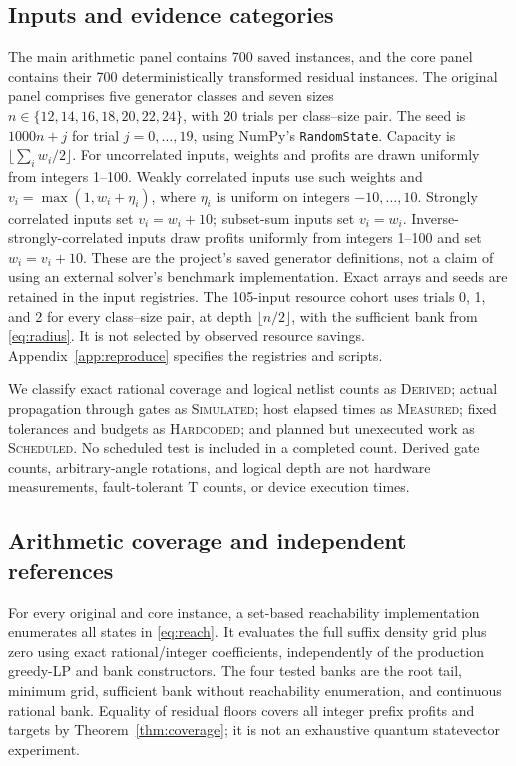 \documentclass[referee,pdflatex,sn-mathphys-num]{sn-jnl}
\theoremstyle{thmstyleone}
\theoremstyle{thmstyletwo}
\begin{document}
\subsection{Inputs and evidence categories}
The main arithmetic panel contains 700 saved instances, and the core panel contains their 700 deterministically transformed residual instances. The original panel comprises five generator classes and seven sizes $n\in\{12,14,16,18,20,22,24\}$, with 20 trials per class--size pair. The seed is $1000n+j$ for trial $j=0,\ldots,19$, using NumPy's \texttt{RandomState}. Capacity is $\lfloor\sum_iw_i/2\rfloor$. For uncorrelated inputs, weights and profits are drawn uniformly from integers 1--100. Weakly correlated inputs use such weights and $v_i=\max(1,w_i+\eta_i)$, where $\eta_i$ is uniform on integers $-10,\ldots,10$. Strongly correlated inputs set $v_i=w_i+10$; subset-sum inputs set $v_i=w_i$. Inverse-strongly-correlated inputs draw profits uniformly from integers 1--100 and set $w_i=v_i+10$. These are the project's saved generator definitions, not a claim of using an external solver's benchmark implementation. Exact arrays and seeds are retained in the input registries. The 105-input resource cohort uses trials 0, 1, and 2 for every class--size pair, at depth $\lfloor n/2\rfloor$, with the sufficient bank from \eqref{eq:radius}. It is not selected by observed resource savings. Appendix~\ref{app:reproduce} specifies the registries and scripts.

We classify exact rational coverage and logical netlist counts as \textsc{Derived}; actual propagation through gates as \textsc{Simulated}; host elapsed times as \textsc{Measured}; fixed tolerances and budgets as \textsc{Hardcoded}; and planned but unexecuted work as \textsc{Scheduled}. No scheduled test is included in a completed count. Derived gate counts, arbitrary-angle rotations, and logical depth are not hardware measurements, fault-tolerant T counts, or device execution times.

\subsection{Arithmetic coverage and independent references}
For every original and core instance, a set-based reachability implementation enumerates all states in \eqref{eq:reach}. It evaluates the full suffix density grid plus zero using exact rational/integer coefficients, independently of the production greedy-LP and bank constructors. The four tested banks are the root tail, minimum grid, sufficient bank without reachability enumeration, and continuous rational bank. Equality of residual floors covers all integer prefix profits and targets by Theorem~\ref{thm:coverage}; it is not an exhaustive quantum statevector experiment.
\end{document}
